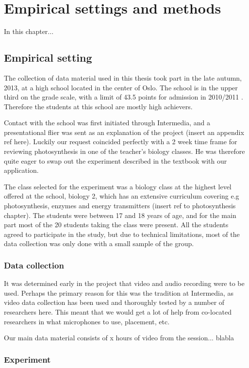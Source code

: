 \chapter{Empirical settings and methods}
In this chapter...

\section{Empirical setting}
The collection of data material used in this thesis took part in the late autumn, 2013, at a high school located in the center of Oslo. The school is in the upper third on the grade scale, with a limit of 43.5 points for admission in 2010/2011 \citep{utdanningsetaten}. Therefore the students at this school are mostly high achievers. 

Contact with the school was first initiated through Intermedia, and a presentational flier was sent as an explanation of the project (insert an appendix ref here). Luckily our request coincided perfectly with a 2 week time frame for reviewing photosynthesis in one of the teacher's biology classes. He was therefore quite eager to swap out the experiment described in the textbook with our application. 

The class selected for the experiment was a biology class at the highest level offered at the school, biology 2, which has an extensive curriculum covering e.g photosynthesis, enzymes and energy transmitters (insert ref to photosynthesis chapter). The students were between 17 and 18 years of age, and for the main part most of the 20 students taking the class were present. All the students agreed to participate in the study, but due to technical limitations, most of the data collection was only done with a small sample of the group. 

\subsection{Data collection}
It was determined early in the project that video and audio recording were to be used. Perhaps the primary reason for this was the tradition at Intermedia, as video data collection has been used and thoroughly tested by a number of researchers here. This meant that we would get a lot of help from co-located researchers in what microphones to use, placement, etc. 

Our main data material consists of x hours of video from the session... blabla

\subsection{Experiment}
